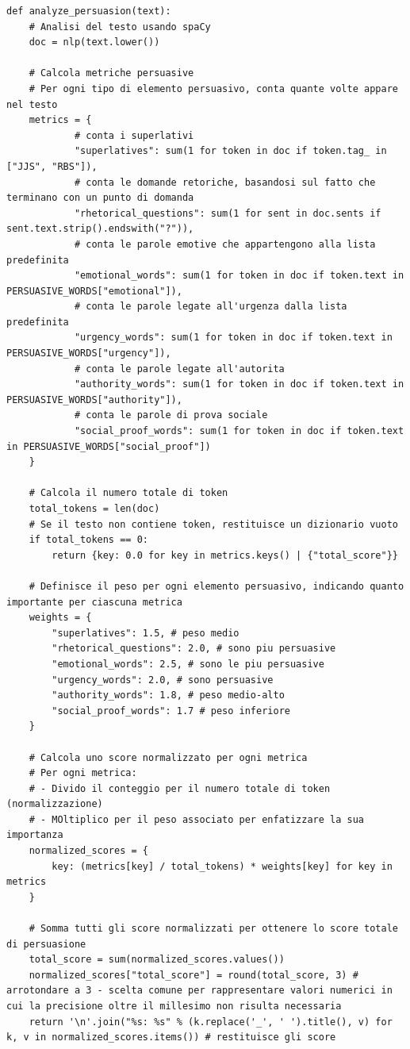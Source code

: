 \documentclass{article}
\begin{document}
	\begin{lstlisting}
def analyze_persuasion(text):
	# Analisi del testo usando spaCy
	doc = nlp(text.lower())
	
	# Calcola metriche persuasive
	# Per ogni tipo di elemento persuasivo, conta quante volte appare nel testo 
	metrics = {
			# conta i superlativi
			"superlatives": sum(1 for token in doc if token.tag_ in ["JJS", "RBS"]),
			# conta le domande retoriche, basandosi sul fatto che terminano con un punto di domanda
			"rhetorical_questions": sum(1 for sent in doc.sents if sent.text.strip().endswith("?")),
			# conta le parole emotive che appartengono alla lista predefinita
			"emotional_words": sum(1 for token in doc if token.text in PERSUASIVE_WORDS["emotional"]),
			# conta le parole legate all'urgenza dalla lista predefinita
			"urgency_words": sum(1 for token in doc if token.text in PERSUASIVE_WORDS["urgency"]),
			# conta le parole legate all'autorita
			"authority_words": sum(1 for token in doc if token.text in PERSUASIVE_WORDS["authority"]),
			# conta le parole di prova sociale
			"social_proof_words": sum(1 for token in doc if token.text in PERSUASIVE_WORDS["social_proof"])
	}

	# Calcola il numero totale di token
	total_tokens = len(doc)
	# Se il testo non contiene token, restituisce un dizionario vuoto
	if total_tokens == 0:
		return {key: 0.0 for key in metrics.keys() | {"total_score"}}

	# Definisce il peso per ogni elemento persuasivo, indicando quanto importante per ciascuna metrica
	weights = {
		"superlatives": 1.5, # peso medio
		"rhetorical_questions": 2.0, # sono piu persuasive
		"emotional_words": 2.5, # sono le piu persuasive
		"urgency_words": 2.0, # sono persuasive 
		"authority_words": 1.8, # peso medio-alto
		"social_proof_words": 1.7 # peso inferiore
	}

	# Calcola uno score normalizzato per ogni metrica
	# Per ogni metrica:
	# - Divido il conteggio per il numero totale di token (normalizzazione)
	# - MOltiplico per il peso associato per enfatizzare la sua importanza 
	normalized_scores = {
		key: (metrics[key] / total_tokens) * weights[key] for key in metrics
	}

	# Somma tutti gli score normalizzati per ottenere lo score totale di persuasione
	total_score = sum(normalized_scores.values())
	normalized_scores["total_score"] = round(total_score, 3) # arrotondare a 3 - scelta comune per rappresentare valori numerici in cui la precisione oltre il millesimo non risulta necessaria	
	return '\n'.join("%s: %s" % (k.replace('_', ' ').title(), v) for k, v in normalized_scores.items()) # restituisce gli score
	\end{lstlisting}
\newpage
\end{document}
